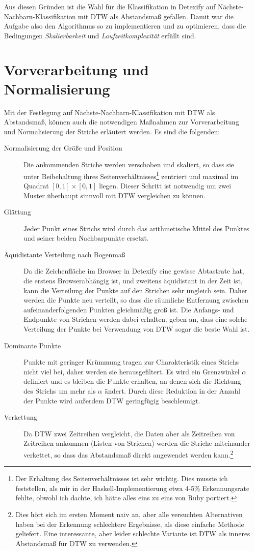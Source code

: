 Aus diesen Gründen ist die Wahl für die Klassifikation in Detexify auf Nächste-Nachbarn-Klassifikation mit DTW als Abstandsmaß gefallen. Damit war die Aufgabe also den Algorithmus so zu implementieren und zu optimieren, dass die Bedingungen \emph{Skalierbarkeit} und \emph{Laufzeitkomplexität} erfüllt sind.

\section{Vorverarbeitung und Normalisierung}
\label{sec:vorverarbeitung2}

Mit der Festlegung auf Nächste-Nachbarn-Klassifikation mit DTW als Abstandsmaß, können auch die notwendigen Maßnahmen zur Vorverarbeitung und Normalisierung der Striche erläutert werden. Es sind die folgenden:

\begin{description}
  \item[Normalisierung der Größe und Position]
  Die ankommenden Striche werden verschoben und skaliert, so dass sie unter Beibehaltung ihres Seitenverhältnisses\footnote{Der Erhaltung des Seitenverhältnisses ist sehr wichtig. Dies musste ich feststellen, als mir in der Haskell-Implementierung etwa 4-5\% Erkennungsrate fehlte, obwohl ich dachte, ich hätte alles eins zu eins von Ruby portiert.} zentriert und maximal im Quadrat \([0,1]\times[0,1]\) liegen. Dieser Schritt ist notwendig um zwei Muster überhaupt sinnvoll mit DTW vergleichen zu können.
  \item[Glättung]
  Jeder Punkt eines Strichs wird durch das arithmetische Mittel des Punktes und seiner beiden Nachbarpunkte ersetzt.
  \item[Äquidistante Verteilung nach Bogenmaß] Da die Zeichenfläche im Browser in Detexify eine gewisse Abtastrate hat, die erstens Browserabhängig ist, und zweitens äquidistant in der Zeit ist, kann die Verteilung der Punkte auf den Strichen sehr ungleich sein. Daher werden die Punkte neu verteilt, so dass die räumliche Entfernung zwischen aufeinanderfolgenden Punkten gleichmäßig groß ist. Die Anfangs- und Endpunkte von Strichen werden dabei erhalten. \citet{Golubitsky:2009p1842} geben an, dass eine solche Verteilung der Punkte bei Verwendung von DTW sogar die beste Wahl ist.
  \item[Dominante Punkte] Punkte mit geringer Krümmung tragen zur Charakteristik eines Strichs nicht viel bei, daher werden sie herausgefiltert. Es wird ein Grenzwinkel $\alpha$ definiert und es bleiben die Punkte erhalten, an denen sich die Richtung des Strichs um mehr als $\alpha$ ändert. Durch diese Reduktion in der Anzahl der Punkte wird außerdem DTW geringfügig beschleunigt.
  \item[Verkettung] Da \ac{DTW} zwei Zeitreihen vergleicht, die Daten aber als Zeitreihen von Zeitreihen ankommen (Listen von Strichen) werden die Striche miteinander verkettet, so dass das Abstandsmaß direkt angewendet werden kann.\footnote{Dies hört sich im ersten Moment naiv an, aber alle versuchten Alternativen haben bei der Erkennung schlechtere Ergebnisse, als diese einfache Methode geliefert. Eine interessante, aber leider schlechte Variante ist DTW als inneres Abstandsmaß für DTW zu verwenden.}
\end{description}

